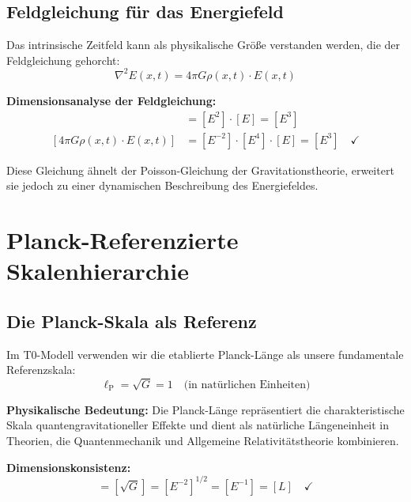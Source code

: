 \documentclass[12pt,a4paper]{report}
\newcommand{\lP}{\ell_{\text{P}}}         %
\begin{document}
	\subsection{Feldgleichung für das Energiefeld}\label{subsec:field_equation}
	
	Das intrinsische Zeitfeld kann als physikalische Größe verstanden werden, die der Feldgleichung gehorcht:
	\begin{equation}
		\nabla^2 E(x,t) = 4\pi G \rho(x,t) \cdot E(x,t)
		\label{eq:energy_field_equation}
	\end{equation}
	
	\textbf{Dimensionsanalyse der Feldgleichung:}
	\begin{align}
		[\nabla^2 E(x,t)] &= [E^2] \cdot [E] = [E^3] \\
		[4\pi G \rho(x,t) \cdot E(x,t)] &= [E^{-2}] \cdot [E^4] \cdot [E] = [E^3] \quad \checkmark
	\end{align}
	
	Diese Gleichung ähnelt der Poisson-Gleichung der Gravitationstheorie, erweitert sie jedoch zu einer dynamischen Beschreibung des Energiefeldes.
	
	\section{Planck-Referenzierte Skalenhierarchie}\label{sec:planck_referenced_scales}
	
	\subsection{Die Planck-Skala als Referenz}\label{subsec:planck_reference}
	
	Im T0-Modell verwenden wir die etablierte Planck-Länge als unsere fundamentale Referenzskala:
	\begin{equation}
		\boxed{\lP = \sqrt{G} = 1 \quad \text{(in natürlichen Einheiten)}}
		\label{eq:planck_length_reference}
	\end{equation}
	
	\textbf{Physikalische Bedeutung:} Die Planck-Länge repräsentiert die charakteristische Skala quantengravitationeller Effekte und dient als natürliche Längeneinheit in Theorien, die Quantenmechanik und Allgemeine Relativitätstheorie kombinieren.
	
	\textbf{Dimensionskonsistenz:}
	\begin{equation}
		[\lP] = [\sqrt{G}] = [E^{-2}]^{1/2} = [E^{-1}] = [L] \quad \checkmark
	\end{equation}
	
\end{document}

